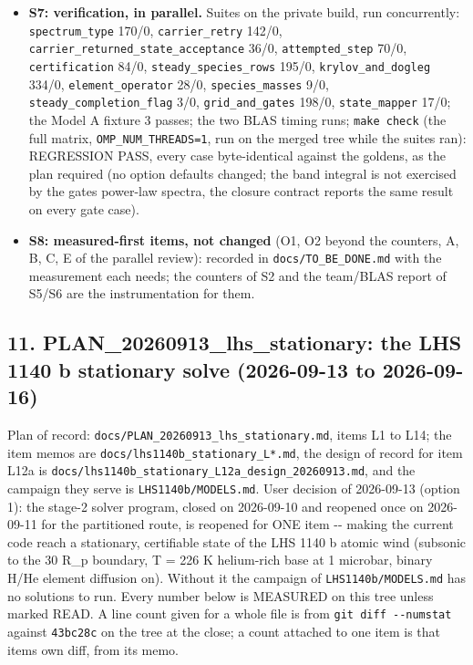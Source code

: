 \documentclass[english,a4paper]{my_memo}
\begin{document}
\begin{itemize}
  factorizations gain nothing from a BLAS team, and the policy costs
  nothing.
\item
  \textbf{S7: verification, in parallel.} Suites on the private build, run
  concurrently: \texttt{spectrum\_type} 170/0, \texttt{carrier\_retry} 142/0,
  \texttt{carrier\_returned\_state\_acceptance} 36/0, \texttt{attempted\_step} 70/0,
  \texttt{certification} 84/0, \texttt{steady\_species\_rows} 195/0, \texttt{krylov\_and\_dogleg}
  334/0, \texttt{element\_operator} 28/0, \texttt{species\_masses} 9/0,
  \texttt{steady\_completion\_flag} 3/0, \texttt{grid\_and\_gates} 198/0, \texttt{state\_mapper}
  17/0; the Model A fixture 3 passes; the two BLAS timing runs;
  \texttt{make\ check} (the full matrix, \texttt{OMP\_NUM\_THREADS=1}, run on the merged
  tree while the suites ran): REGRESSION PASS, every case byte-identical
  against the goldens, as the plan required (no option defaults changed;
  the band integral is not exercised by the gate\textquotesingle s power-law spectra, the
  closure contract reports the same result on every gate case).
\item
  \textbf{S8: measured-first items, not changed} (O1, O2 beyond the counters,
  A, B, C, E of the parallel review): recorded in \texttt{docs/TO\_BE\_DONE.md} with
  the measurement each needs; the counters of S2 and the team/BLAS report
  of S5/S6 are the instrumentation for them.
\end{itemize}

\subsection{11. PLAN\_20260913\_lhs\_stationary: the LHS 1140 b stationary solve (2026-09-13 to 2026-09-16)}\label{11-plan_20260913_lhs_stationary-the-lhs-1140-b-stationary-solve-2026-09-13-to-2026-09-16}

Plan of record: \texttt{docs/PLAN\_20260913\_lhs\_stationary.md}, items L1 to L14; the
item memos are \texttt{docs/lhs1140b\_stationary\_L*.md}, the design of record for
item L12a is \texttt{docs/lhs1140b\_stationary\_L12a\_design\_20260913.md}, and the
campaign they serve is \texttt{LHS1140b/MODELS.md}. User decision of 2026-09-13 (option 1): the stage-2
solver program, closed on 2026-09-10 and reopened once on 2026-09-11 for the
partitioned route, is reopened for ONE item -\/- making the current code reach a
stationary, certifiable state of the LHS 1140 b atomic wind (subsonic to the
30 R\_p boundary, T = 226 K helium-rich base at 1 microbar, binary H/He element
diffusion on). Without it the campaign of \texttt{LHS1140b/MODELS.md} has no
solutions to run. Every number below is MEASURED on this tree unless marked
READ. A line count given for a whole file is from \texttt{git\ diff\ -\/-numstat} against
\texttt{43bc28c} on the tree at the close; a count attached to one item is that
item\textquotesingle s own diff, from its memo.
\end{document}
